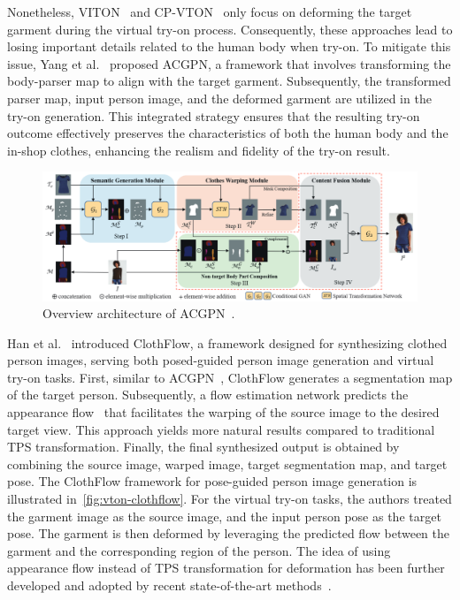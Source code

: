 Nonetheless, VITON~\cite{Han-CVPR2018-Viton} and CP-VTON~\cite{Wang-ECCV2018-Toward} only focus on deforming the target garment during the virtual try-on process. Consequently, these approaches lead to losing important details related to the human body when try-on. To mitigate this issue, Yang et al.~\cite{Yang-CVPR2020-Towards} proposed ACGPN, a framework that involves transforming the body-parser map to align with the target garment. Subsequently, the transformed parser map, input person image, and the deformed garment are utilized in the try-on generation. This integrated strategy ensures that the resulting try-on outcome effectively preserves the characteristics of both the human body and the in-shop clothes, enhancing the realism and fidelity of the try-on result.

\begin{figure}[h!]
    \centering
    \includegraphics[width=\linewidth]{content/resources/images/literature-review/acgpn.png}
    \caption{Overview architecture of ACGPN~\cite{Yang-CVPR2020-Towards}.}
    \label{fig:vton-acgpn}
\end{figure}

Han et al.~\cite{Han-ICCV2019-Clothflow} introduced ClothFlow, a framework designed for synthesizing clothed person images, serving both posed-guided person image generation and virtual try-on tasks. First, similar to ACGPN~\cite{Yang-CVPR2020-Towards}, ClothFlow generates a segmentation map of the target person. Subsequently, a flow estimation network predicts the appearance flow~\cite{Zhou-ECCV2016-AppearanceFlow} that facilitates the warping of the source image to the desired target view. This approach yields more natural results compared to traditional TPS transformation. Finally, the final synthesized output is obtained by combining the source image, warped image, target segmentation map, and target pose. The ClothFlow framework for pose-guided person image generation is illustrated in~\autoref{fig:vton-clothflow}. For the virtual try-on tasks, the authors treated the garment image as the source image, and the input person pose as the target pose. The garment is then deformed by leveraging the predicted flow between the garment and the corresponding region of the person. The idea of using appearance flow instead of TPS transformation for deformation has been further developed and adopted by recent state-of-the-art methods~\cite{Ge-CVPR2021-Parser, He-CVPR2022-Style}.

